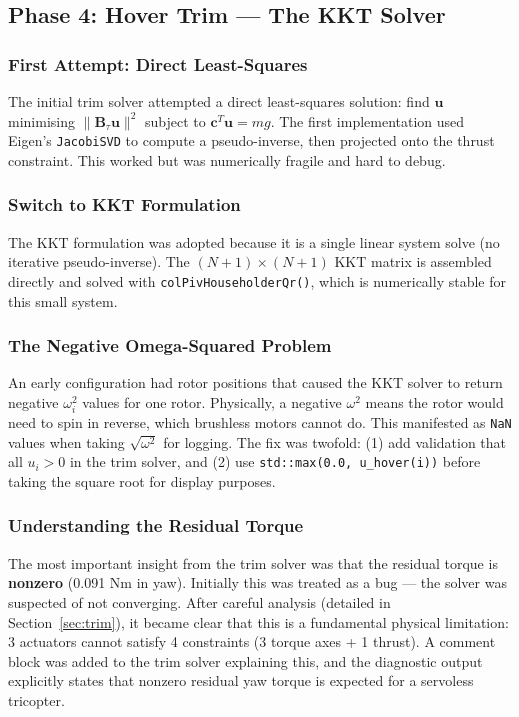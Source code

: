 \documentclass[12pt, a4paper]{article}
\newcommand{\bu}{\bm{u}}
\newcommand{\bB}{\bm{B}}
\begin{document}
\subsection{Phase 4: Hover Trim --- The KKT Solver}

\subsubsection{First Attempt: Direct Least-Squares}

The initial trim solver attempted a direct least-squares solution: find $\bu$ minimising $\|\bB_\tau \bu\|^2$ subject to $\bm{c}^T \bu = mg$.  The first implementation used Eigen's \texttt{JacobiSVD} to compute a pseudo-inverse, then projected onto the thrust constraint.  This worked but was numerically fragile and hard to debug.

\subsubsection{Switch to KKT Formulation}

The KKT formulation was adopted because it is a single linear system solve (no iterative pseudo-inverse).  The $(N+1) \times (N+1)$ KKT matrix is assembled directly and solved with \texttt{colPivHouseholderQr()}, which is numerically stable for this small system.

\subsubsection{The Negative Omega-Squared Problem}

An early configuration had rotor positions that caused the KKT solver to return negative $\omega_i^2$ values for one rotor.  Physically, a negative $\omega^2$ means the rotor would need to spin in reverse, which brushless motors cannot do.  This manifested as \texttt{NaN} values when taking $\sqrt{\omega^2}$ for logging.  The fix was twofold: (1) add validation that all $u_i > 0$ in the trim solver, and (2) use \texttt{std::max(0.0, u\_hover(i))} before taking the square root for display purposes.

\subsubsection{Understanding the Residual Torque}

The most important insight from the trim solver was that the residual torque is \textbf{nonzero} (0.091 Nm in yaw).  Initially this was treated as a bug --- the solver was suspected of not converging.  After careful analysis (detailed in Section~\ref{sec:trim}), it became clear that this is a fundamental physical limitation: 3 actuators cannot satisfy 4 constraints (3 torque axes + 1 thrust).  A comment block was added to the trim solver explaining this, and the diagnostic output explicitly states that nonzero residual yaw torque is expected for a servoless tricopter.
\end{document}

